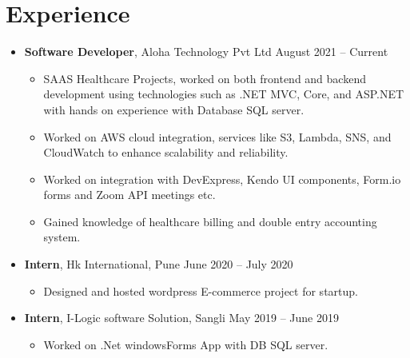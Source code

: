 \documentclass[letterpaper,11pt]{article}
\begin{document}
\section*{Experience}
\begin{itemize}[leftmargin=*]
    \item \textbf{Software Developer}, Aloha Technology Pvt Ltd \hfill August 2021 -- Current
    \begin{itemize}[leftmargin=*]
        \item SAAS Healthcare Projects, worked on both frontend and backend development using technologies such as .NET MVC, Core, and ASP.NET with hands on experience with Database SQL server. 
        \item Worked on AWS cloud integration, services like S3, Lambda, SNS, and CloudWatch to enhance scalability and reliability.
        \item Worked on integration with DevExpress, Kendo UI components, Form.io forms and Zoom API meetings etc.
        \item Gained knowledge of healthcare billing and double entry accounting system.
    \end{itemize}

    \item \textbf{Intern}, Hk International, Pune \hfill June 2020 -- July 2020 \\
    \begin{itemize}[leftmargin=*]
        \item Designed and hosted wordpress E-commerce project for startup.
    \end{itemize}

    \item \textbf{Intern}, I-Logic software Solution, Sangli \hfill May 2019 -- June 2019 \\
    \begin{itemize}[leftmargin=*]
        \item Worked on .Net windowsForms App with DB SQL server.
    \end{itemize}
\end{itemize}


\end{document}
